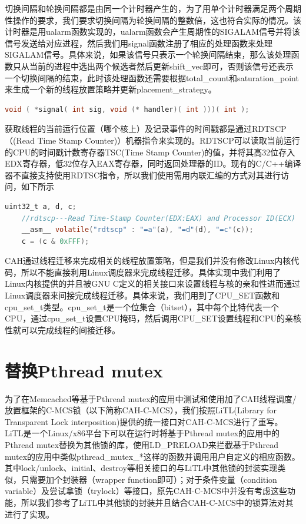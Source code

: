 切换间隔和轮换间隔都是由同一个计时器产生的，为了用单个计时器满足两个周期性操作的要求，我们要求切换间隔为轮换间隔的整数倍，这也符合实际的情况。该计时器是用ualarm函数实现的，ualarm函数会产生周期性的SIGALAM信号并将该信号发送给对应进程，然后我们用signal函数注册了相应的处理函数来处理SIGALAM信号。具体来说，如果该信号只表示一个轮换间隔结束，那么该处理函数只从当前的进程中选出两个候选者然后更新shift\_vec即可，否则该信号还表示一个切换间隔的结束，此时该处理函数还需要根据total\_count和saturation\_point来生成一个新的线程放置策略并更新placement\_strategy。
\begin{lstlisting}[language={C}, caption={注册信号处理函数}]
void ( *signal( int sig, void (* handler)( int )))( int );
\end{lstlisting}

获取线程的当前运行位置（哪个核上）及记录事件的时间戳都是通过RDTSCP（(Read Time Stamp Counter)）机器指令来实现的。RDTSCP可以读取当前运行的CPU的时间戳计数寄存器TSC(Time Stamp Counter)的值，并将其高32位存入EDX寄存器，低32位存入EAX寄存器，同时返回处理器的ID。现有的C/C++编译器不直接支持使用RDTSC指令，所以我们使用需用内联汇编的方式对其进行访问，如下所示
\begin{lstlisting}[language={C}, caption={通过内联汇编来使用RDTSCP指令}]
    uint32_t a, d, c;
    //rdtscp---Read Time-Stamp Counter(EDX:EAX) and Processor ID(ECX)
    __asm__ volatile("rdtscp" : "=a"(a), "=d"(d), "=c"(c));
    c = (c & 0xFFF);
\end{lstlisting}

CAH通过线程迁移来完成相关的线程放置策略，但是我们并没有修改Linux内核代码，所以不能直接利用Linux调度器来完成线程迁移。具体实现中我们利用了Linux内核提供的并且被GNU C定义的相关接口来设置线程与核的亲和性进而通过Linux调度器来间接完成线程迁移。具体来说，我们用到了CPU\_SET函数和cpu\_set\_t类型。cpu\_set\_t是一个位集合（bitset），其中每个比特代表一个CPU，通过cpu\_set\_t设置CPU掩码，然后调用CPU\_SET设置线程和CPU的亲核性就可以完成线程的间接迁移。

\section{替换Pthread mutex}
为了在Memcached等基于Pthread mutex的应用中测试和使用加了CAH线程调度/放置框架的C-MCS锁（以下简称CAH-C-MCS），我们按照LiTL\cite{guiroux2016multicore}(Library for Transparent Lock interposition)提供的统一接口对CAH-C-MCS进行了重写。LiTL是一个Linux/x86平台下可以在运行时将基于Pthread mutex的应用中的Pthread mutex替换为其他锁的库，使用LD\_PRELOAD来拦截基于Pthread mutex的应用中类似pthread\_mutex\_*这样的函数并调用用户自定义的相应函数。其中lock/unlock、initial、destroy等相关接口的与LiTL中其他锁的封装实现类似，只需要加个封装器（wrapper function即可）；对于条件变量（condition variable）及尝试拿锁（trylock）等接口，原先CAH-C-MCS中并没有考虑这些功能，所以我们参考了LiTL中其他锁的封装并且结合CAH-C-MCS中的锁算法对其进行了实现。

